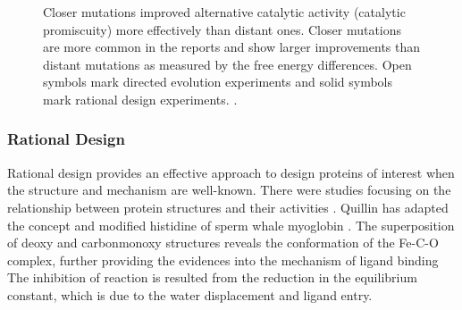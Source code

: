 \begin{refsection}
\begin{figure}[htbp]
    \caption[Closer mutations improved alternative catalytic activity
    (catalytic promiscuity) more effectively than distant ones. Closer
mutations are more common in the reports and show larger improvements than
distant mutations as measured by the free energy differences. Open symbols mark
directed evolution experiments and solid symbols mark rational design
experiments.]{Closer mutations improved alternative catalytic activity
    (catalytic promiscuity) more effectively than distant ones. Closer
    mutations are more common in the reports and show larger improvements than
    distant mutations as measured by the free energy differences. Open symbols
    mark directed evolution experiments and solid symbols mark rational design
    experiments. \cite{Kazlauskas2005a}.}
    \label{fig:protein-engineering-example} 
\end{figure}

\subsubsection{Rational Design}
\label{sec:rational-design}

Rational design provides an effective approach to design proteins of interest
when the structure and mechanism are well-known. There were studies focusing on
the relationship between protein structures and their activities
\cite{Beadle2002a,Quillin1993}. Quillin  has adapted the concept
and modified histidine of sperm whale myoglobin \cite{Quillin1993}. The
superposition of deoxy and carbonmonoxy structures reveals the conformation of
the Fe-C-O complex, further providing the evidences into the mechanism of
ligand binding \cite{Quillin1993} The inhibition of reaction is resulted from
the reduction in the equilibrium constant, which is due to the water
displacement and ligand entry. 


\end{refsection}
